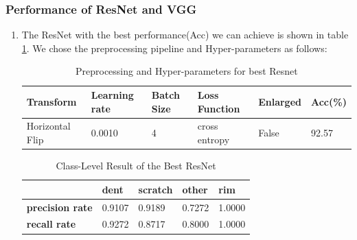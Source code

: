\documentclass[lang=english,inputenc=utf8,fontsize=10pt]{ldvarticle}
\begin{document}
\subsubsection{Performance of ResNet and VGG}
\begin{enumerate}[label=\alph*)]
    \item 
    The ResNet with the best performance(Acc) we can achieve is shown in table \ref{Preprocessing and Hyperparameters for best Resnet}. We chose the preprocessing pipeline and Hyper-parameters as follows:\\
    \begin{table}[H] 
        \begin{center}  
            \caption{Preprocessing and Hyper-parameters for best Resnet}  
            \label{Preprocessing and Hyperparameters for best Resnet}
            \begin{tabular}{|m{2cm}<{\centering}|m{2cm}<{\centering}|m{2cm}<{\centering}|m{2cm}<{\centering}|m{2cm}<{\centering}|m{2cm}<{\centering}|}   
            \hline   \textbf{Transform} & \textbf{Learning rate}& \textbf{Batch Size} & \textbf{Loss Function} & \textbf{Enlarged} & \textbf{Acc(\%)} \\   
            \hline   Horizontal Flip & 0.0010 & 4 & cross entropy & False & 92.57 \\  
            \hline   
            \end{tabular}   
        \end{center}  
    \end{table}
    \begin{table}[H]   
        \begin{center}   
        \caption{Class-Level Result of the Best ResNet}  
        \label{ResNet performance} 
        \begin{tabular}{|m{2cm}<{\centering}|m{2cm}<{\centering}|m{2.0cm}<{\centering}|m{2cm}<{\centering}|m{2cm}<{\centering}|}   
        \hline   &\textbf{dent} & \textbf{scratch} & \textbf{other} & \textbf{rim}\\ 
        \hline   \textbf{precision rate}  & 0.9107 & 0.9189 & 0.7272 & 1.0000  \\ 
        \hline   \textbf{recall rate} & 0.9272 & 0.8717 & 0.8000 & 1.0000   \\
        \hline 

\end{tabular}
\end{center}
\end{table}
\end{enumerate}
\end{document}
